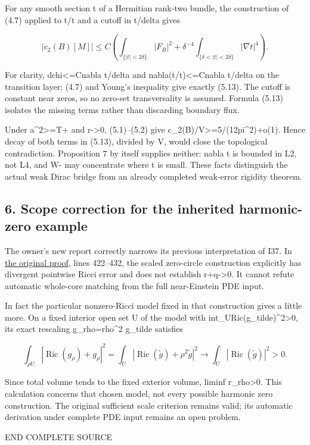 \documentclass[
  10pt,
]{article}
\begin{document}
For any smooth section t of a Hermitian rank-two bundle, the
construction of (4.7) applied to t/\textbar t\textbar{} and a cutoff in
\textbar t\textbar/delta gives

\[
 |c_2(B)[M]|\le C\left(
    \int_{\{|t|<2\delta\}}|F_B|^2+
    \delta^{-4}\int_{\{\delta<|t|<2\delta\}}|\nabla t|^4\right).
                                                        \tag{5.13}
\]

For clarity, \textbar dchi\textbar\textless=C\textbar nabla
t\textbar/delta and
\textbar nabla(t/\textbar t\textbar)\textbar\textless=C\textbar nabla
t\textbar/delta on the transition layer; (4.7) and Young's inequality
give exactly (5.13). The cutoff is constant near zeros, so no zero-set
transversality is assumed. Formula (5.13) isolates the missing terms
rather than discarding boundary flux.

Under a\^{}2\textgreater=T+ and r-\textgreater0, (5.1)--(5.2) give
c\_2(B)/V\textgreater=5/(12pi\^{}2)+o(1). Hence decay of both terms in
(5.13), divided by V, would close the topological contradiction.
Proposition 7 by itself supplies neither: nabla t is bounded in L2, not
L4, and W- may concentrate where t is small. These facts distinguish the
actual weak Dirac bridge from an already completed weak-error rigidity
theorem.

\hypertarget{scope-correction-for-the-inherited-harmonic-zero-example}{%
\subsection{6. Scope correction for the inherited harmonic-zero
example}\label{scope-correction-for-the-inherited-harmonic-zero-example}}

The owner's new report correctly narrows its previous interpretation of
I37. In \href{20260924_harmonic_zero_scale.md}{the original proof},
lines 422--432, the scaled zero-circle construction explicitly has
divergent pointwise Ricci error and does not establish
r+q-\textgreater0. It cannot refute automatic whole-core matching from
the full near-Einstein PDE input.

In fact the particular nonzero-Ricci model fixed in that construction
gives a little more. On a fixed interior open set U of the model with
int\_U\textbar Ric(g\_tilde)\textbar\^{}2\textgreater0, its exact
rescaling g\_rho=rho\^{}2 g\_tilde satisfies

\[
 \int_{\rho U}|\operatorname{Ric}(g_\rho)+g_\rho|^2
 =\int_U|\operatorname{Ric}(\widetilde g)+\rho^2\widetilde g|^2
 \longrightarrow\int_U|\operatorname{Ric}(\widetilde g)|^2>0.
\]

Since total volume tends to the fixed exterior volume, liminf
r\_rho\textgreater0. This calculation concerns that chosen model, not
every possible harmonic zero construction. The original sufficient scale
criterion remains valid; its automatic derivation under complete PDE
input remains an open problem.

END COMPLETE SOURCE
\end{document}

